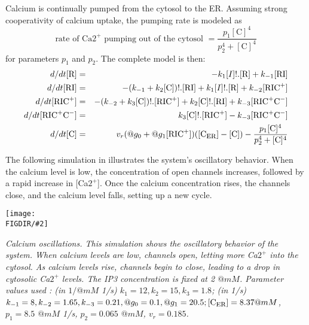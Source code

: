 \documentclass[12pt]{article}
\newcommand{\pic}[2]{\texttt{[image: \\FIGDIR/\#2]}}
\newcommand{\picc}[2]{\centerline{\pic{#1}{#2}}}
\newcommand{\beqn}{\begin{eqnarray*}}
\newcommand{\eeqn}{\end{eqnarray*}}
\newcommand{\tim}{} %
\newcommand{\CER}{\mbox{C}_{\mbox{\sc er}}}
\newcommand{\RICC}{\mbox{RIC}^+\mbox{C}^-}
\newcommand{\RIC}{\mbox{RIC}^+}
\newcommand{\RI}{\mbox{RI}}
\newcommand{\CC}{\mbox{C}}
\newcommand{\RR}{\mbox{R}}
\begin{document}
Calcium is continually pumped from the cytosol to the ER.  Assuming strong
cooperativity of calcium uptake, the pumping rate is modeled as
\[
\mbox{rate of Ca$2^+$ pumping out of the cytosol 
$\displaystyle=\frac{p_1[\CC]^4}{p_2^4+[\CC]^4 }$}
\]
for parameters $p_1$ and $p_2$. 
The complete model is then: 
\beqn
d/dt[\RR]\tim &=& -k_{1}[I]\tim !.[\RR]\tim +k_{-1}[\RI]\tim \\
d/dt[\RI]\tim &=& -(k_{-1}+ 
k_2[\CC]\tim )!.[\RI]\tim +
k_{1}[I]\tim !.[\RR]\tim +
k_{-2}[\RIC]\tim \\
d/dt[\RIC]\tim &=& -(k_{-2}+
k_3[\CC]\tim )!.[\RIC]\tim +
k_2[\CC]\tim !.[\RI]\tim +
k_{-3}[\RICC]\tim \\
d/dt[\RICC]\tim &=& k_3[\CC]\tim !.[\RIC]\tim - 
k_{-3}[\RICC]\tim \\
d/dt[\CC]\tim &=& v_r(@g_0+@g_1[\RIC])([\CER ]- [\CC])
- \frac{p_1[\CC]^4}{p_2^4+[\CC]^4 }
\eeqn

The following simulation in illustrates the system's oscillatory
behavior.  When the calcium level is low, the concentration of open channels
increases, followed by a rapid increase in [Ca$2^+$].
Once the calcium concentration rises, the channels close, and the calcium
level falls, setting up a new cycle. 


\picc{0.6}{calcium_main_illustration.png}

\emph{Calcium oscillations. This simulation shows the oscillatory
behavior of the system. When calcium levels are low, channels open, letting
more Ca$2^+$ into the cytosol. As calcium levels rise, channels begin to close,
leading to a drop in cytosolic Ca$2^+$ levels. The IP3 concentration is fixed at
2 $@mM$. 
Parameter values used : (in $1/@mM$ 1/s) $k_{1} = 12, k_2 = 15, k_3 =1.8$; (in
1/s) $k_{-1} = 8, k_{-2} =1.65, k_{-3} =0.21, @g_0 =0.1, @g_1 =20.5; [\CER ]=8.37
@mM$, $p_1 =8.5$ $@mM$ 1/s, $p_2 =0.065$ $@mM$, $v_r =0.185$.}





\end{document}
